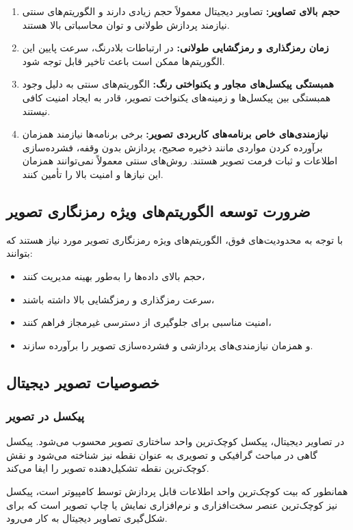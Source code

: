 \documentclass[a4paper,12pt]{report}
\renewcommand{\%}{\lr{\oldpercent}}
\begin{document}
\begin{enumerate}
    \item \textbf{حجم بالای تصاویر:} تصاویر دیجیتال معمولاً حجم زیادی دارند و الگوریتم‌های سنتی نیازمند پردازش طولانی و توان محاسباتی بالا هستند.
    \item \textbf{زمان رمزگذاری و رمزگشایی طولانی:} در ارتباطات بلادرنگ، سرعت پایین این الگوریتم‌ها ممکن است باعث تاخیر قابل توجه شود.
    \item \textbf{همبستگی پیکسل‌های مجاور و یکنواختی رنگ:} الگوریتم‌های سنتی به دلیل وجود همبستگی بین پیکسل‌ها و زمینه‌های یکنواخت تصویر، قادر به ایجاد امنیت کافی نیستند.
    \item \textbf{نیازمندی‌های خاص برنامه‌های کاربردی تصویر:} برخی برنامه‌ها نیازمند همزمان برآورده کردن مواردی مانند ذخیره صحیح، پردازش بدون وقفه، فشرده‌سازی اطلاعات و ثبات فرمت تصویر هستند. روش‌های سنتی معمولاً نمی‌توانند همزمان این نیازها و امنیت بالا را تأمین کنند.
\end{enumerate}

\subsection{ضرورت توسعه الگوریتم‌های ویژه رمزنگاری تصویر}
با توجه به محدودیت‌های فوق، الگوریتم‌های ویژه رمزنگاری تصویر مورد نیاز هستند که بتوانند:
\begin{itemize}
    \item حجم بالای داده‌ها را به‌طور بهینه مدیریت کنند،
    \item سرعت رمزگذاری و رمزگشایی بالا داشته باشند،
    \item امنیت مناسبی برای جلوگیری از دسترسی غیرمجاز فراهم کنند،
    \item و همزمان نیازمندی‌های پردازشی و فشرده‌سازی تصویر را برآورده سازند\cite{ref45}.
\end{itemize}

\subsection{خصوصیات تصویر دیجیتال}
\subsubsection{پیکسل در تصویر}
در تصاویر دیجیتال، پیکسل کوچک‌ترین واحد ساختاری تصویر محسوب می‌شود\cite{ref46}. پیکسل گاهی در مباحث گرافیکی و تصویری به عنوان نقطه نیز شناخته می‌شود و نقش کوچک‌ترین نقطه تشکیل‌دهنده تصویر را ایفا می‌کند.

همانطور که بیت کوچک‌ترین واحد اطلاعات قابل پردازش توسط کامپیوتر است، پیکسل نیز کوچک‌ترین عنصر سخت‌افزاری و نرم‌افزاری نمایش یا چاپ تصویر است که برای شکل‌گیری تصاویر دیجیتال به کار می‌رود.
\end{document}
